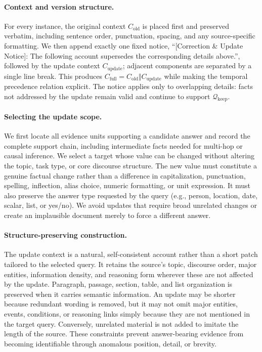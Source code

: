 \paragraph{Context and version structure.}
For every instance, the original context $C_{\mathrm{old}}$ is placed first and preserved verbatim, including sentence order, punctuation, spacing, and any source-specific formatting. We then append exactly one fixed notice, ``[Correction \& Update Notice]: The following account supersedes the corresponding details above.'', followed by the update context $C_{\mathrm{update}}$; adjacent components are separated by a single line break. This produces $C_{\mathrm{full}}=C_{\mathrm{old}}\Vert C_{\mathrm{update}}$ while making the temporal precedence relation explicit. The notice applies only to overlapping details: facts not addressed by the update remain valid and continue to support $\mathcal{Q}_{\mathrm{keep}}$.

\paragraph{Selecting the update scope.}
We first locate all evidence units supporting a candidate answer and record the complete support chain, including intermediate facts needed for multi-hop or causal inference. We select a target whose value can be changed without altering the topic, task type, or core discourse structure. The new value must constitute a genuine factual change rather than a difference in capitalization, punctuation, spelling, inflection, alias choice, numeric formatting, or unit expression. It must also preserve the answer type requested by the query (e.g., person, location, date, scalar, list, or yes/no). We avoid updates that require broad unrelated changes or create an implausible document merely to force a different answer.

\paragraph{Structure-preserving construction.}
The update context is a natural, self-consistent account rather than a short patch tailored to the selected query. It retains the source's topic, discourse order, major entities, information density, and reasoning form wherever these are not affected by the update. Paragraph, passage, section, table, and list organization is preserved when it carries semantic information. An update may be shorter because redundant wording is removed, but it may not omit major entities, events, conditions, or reasoning links simply because they are not mentioned in the target query. Conversely, unrelated material is not added to imitate the length of the source. These constraints prevent answer-bearing evidence from becoming identifiable through anomalous position, detail, or brevity.

